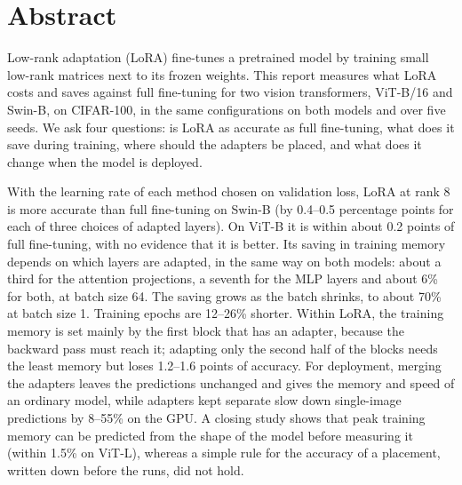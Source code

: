 \chapter*{\centering Abstract}
\onehalfspacing
Low-rank adaptation (LoRA) fine-tunes a pretrained model by training small low-rank matrices next to its frozen
weights. This report measures what LoRA costs and saves against full fine-tuning for two vision transformers,
ViT-B/16 and Swin-B, on CIFAR-100, in the same configurations on both models and over five seeds. We ask four
questions: is LoRA as accurate as full fine-tuning, what does it save during training, where should the adapters be
placed, and what does it change when the model is deployed.

With the learning rate of each method chosen on validation loss, LoRA at rank 8 is more accurate than full
fine-tuning on Swin-B (by 0.4--0.5 percentage points for each of three choices of adapted layers). On ViT-B it is
within about 0.2 points of full fine-tuning, with no evidence that it is better. Its saving in training memory depends on which layers are adapted,
in the same way on both models: about a third for the attention projections, a seventh for the MLP layers and about 6\%
for both, at batch size 64. The saving grows as the batch shrinks, to about 70\% at batch size 1. Training epochs
are 12--26\% shorter. Within LoRA, the training memory is set mainly by the first block that has an adapter, because
the backward pass must reach it; adapting only the second half of the blocks needs the least memory but loses
1.2--1.6 points of accuracy. For deployment, merging the adapters leaves the predictions unchanged and gives the
memory and speed of an ordinary model, while adapters kept separate slow down single-image predictions by 8--55\% on
the GPU. A closing study shows that peak training memory can be predicted from the shape of the model before
measuring it (within 1.5\% on ViT-L), whereas a simple rule for the accuracy of a placement, written down before
the runs, did not hold.
